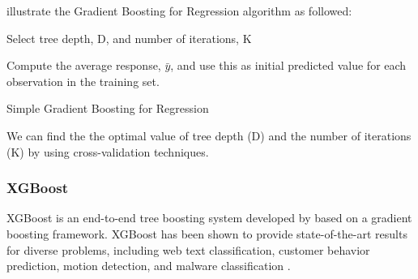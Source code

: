 
\textcite{kuhn2013applied} illustrate the Gradient Boosting for
Regression algorithm as followed:

\begin{algorithm}[H]
\SetAlgoLined

\renewcommand{\labelenumi}{(\Roman{enumi})}
Select tree depth, D, and number of iterations, K

Compute the average response, $\bar{y}$, and use this as initial predicted value
for each observation in the training set.

 \caption{Simple Gradient Boosting for Regression}
\end{algorithm}

We can find the the optimal value of tree depth (D) and the number of
iterations (K) by using cross-validation techniques.

\subsubsection*{XGBoost}

XGBoost is an end-to-end tree boosting system developed by
\textcite{chen2016xgboost} based on a
gradient boosting framework.  XGBoost has been shown to provide state-of-the-art
results for diverse problems, including web text classification, customer
behavior prediction, motion detection, and malware classification
\parencite{chen2016xgboost}.

